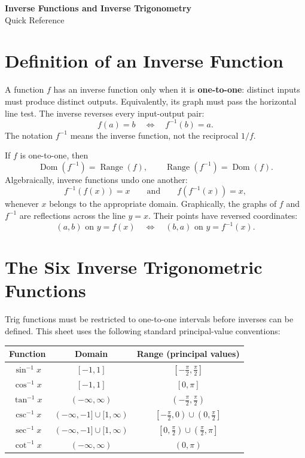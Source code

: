 \documentclass[12pt]{article}
\begin{document}
\begin{center}
  {\LARGE\textbf{Inverse Functions and Inverse Trigonometry}}\\[5pt]
  {\Large Quick Reference}
\end{center}

\section*{Definition of an Inverse Function}
A function $f$ has an inverse function only when it is \textbf{one-to-one}: distinct inputs must produce distinct outputs. Equivalently, its graph must pass the horizontal line test. The inverse reverses every input-output pair:
\[
  f(a)=b \quad\Longleftrightarrow\quad f^{-1}(b)=a.
\]
The notation $f^{-1}$ means the inverse function, not the reciprocal $1/f$.

If $f$ is one-to-one, then
\[
  \operatorname{Dom}(f^{-1})=\operatorname{Range}(f),
  \qquad
  \operatorname{Range}(f^{-1})=\operatorname{Dom}(f).
\]
Algebraically, inverse functions undo one another:
\[
  f^{-1}(f(x))=x
  \qquad\text{and}\qquad
  f(f^{-1}(x))=x,
\]
whenever $x$ belongs to the appropriate domain. Graphically, the graphs of $f$ and $f^{-1}$ are reflections across the line $y=x$. Their points have reversed coordinates:
\[
  (a,b)\text{ on }y=f(x)
  \quad\Longleftrightarrow\quad
  (b,a)\text{ on }y=f^{-1}(x).
\]

\section*{The Six Inverse Trigonometric Functions}
Trig functions must be restricted to one-to-one intervals before inverses can be defined. This sheet uses the following standard principal-value conventions:

\begin{center}
\renewcommand{\arraystretch}{1.45}
\begin{tabular}{c|c|c}
\textbf{Function} & \textbf{Domain} & \textbf{Range (principal values)}\\ \hline
$\sin^{-1}x$ & $[-1,1]$ & $\left[-\frac\pi2,\frac\pi2\right]$\\
$\cos^{-1}x$ & $[-1,1]$ & $[0,\pi]$\\
$\tan^{-1}x$ & $(-\infty,\infty)$ & $\left(-\frac\pi2,\frac\pi2\right)$\\
$\csc^{-1}x$ & $(-\infty,-1]\cup[1,\infty)$ & $\left[-\frac\pi2,0\right)\cup\left(0,\frac\pi2\right]$\\
$\sec^{-1}x$ & $(-\infty,-1]\cup[1,\infty)$ & $\left[0,\frac\pi2\right)\cup\left(\frac\pi2,\pi\right]$\\
$\cot^{-1}x$ & $(-\infty,\infty)$ & $(0,\pi)$
\end{tabular}
\end{center}
\end{document}
